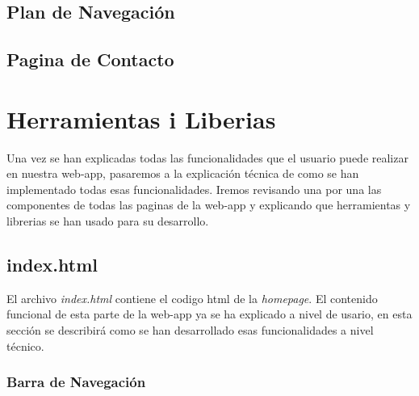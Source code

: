 \documentclass{article}
\begin{document}
\subsection{Plan de Navegación}

\subsection{Pagina de Contacto}

\section{Herramientas i Liberias}
Una vez se han explicadas todas las funcionalidades que el usuario puede realizar en nuestra web-app, pasaremos a la explicación técnica de como se han implementado todas esas funcionalidades. Iremos revisando una por una las componentes de todas las paginas de la web-app y explicando que herramientas y librerias se han usado para su desarrollo.
\subsection{index.html}
El archivo \textit{index.html} contiene el codigo html de la \textit{homepage}. El contenido funcional de esta parte de la web-app ya se ha explicado a nivel de usario, en esta sección se describirá como se han desarrollado esas funcionalidades a nivel técnico.

\subsubsection{Barra de Navegación}
\end{document}
